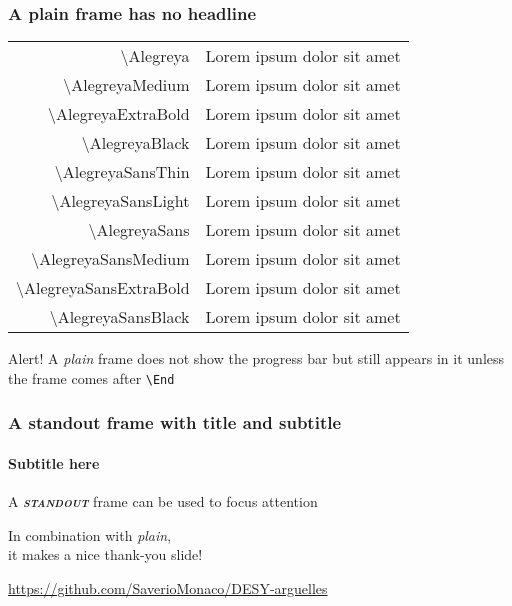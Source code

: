 \documentclass[compress,12pt,aspectratio=169]{beamer}
\begin{document}
\begin{frame}[plain]
	\frametitle{A plain frame has no headline}
	\begin{table}
		\small
		\begin{tabular}{rl}
			\ttfamily\textbackslash Alegreya              & \Alegreya Lorem ipsum dolor sit amet              \\
			\ttfamily\textbackslash AlegreyaMedium        & \AlegreyaMedium Lorem ipsum dolor sit amet        \\
			\ttfamily\textbackslash AlegreyaExtraBold     & \AlegreyaExtraBold Lorem ipsum dolor sit amet     \\
			\ttfamily\textbackslash AlegreyaBlack         & \AlegreyaBlack Lorem ipsum dolor sit amet         \\
			\ttfamily\textbackslash AlegreyaSansThin      & \AlegreyaSansThin Lorem ipsum dolor sit amet      \\
			\ttfamily\textbackslash AlegreyaSansLight     & \AlegreyaSansLight Lorem ipsum dolor sit amet     \\
			\ttfamily\textbackslash AlegreyaSans          & \AlegreyaSans Lorem ipsum dolor sit amet          \\
			\ttfamily\textbackslash AlegreyaSansMedium    & \AlegreyaSansMedium Lorem ipsum dolor sit amet    \\
			\ttfamily\textbackslash AlegreyaSansExtraBold & \AlegreyaSansExtraBold Lorem ipsum dolor sit amet \\
			\ttfamily\textbackslash AlegreyaSansBlack     & \AlegreyaSansBlack Lorem ipsum dolor sit amet
		\end{tabular}
	\end{table}
	\vfill
	\begin{alert}{Alert!}
		A \textit{plain} frame does not show the progress bar but still appears in it unless the frame comes after \texttt{\textbackslash End}
	\end{alert}
\end{frame}

\begin{frame}[standout]
	\frametitle{A standout frame with title and subtitle}
	\framesubtitle{Subtitle here}
	\centering\large
	A \textbf{\itshape\scshape standout} frame can be used to focus attention
\end{frame}

\End
\begin{frame}
	\centering
	In combination with \textit{plain}, \\
	it makes a nice thank-you slide!
	\vfill
	\scalebox{4}{\faGithub} \par\bigskip
	\url{https://github.com/SaverioMonaco/DESY-arguelles}
\end{frame}
\end{document}
